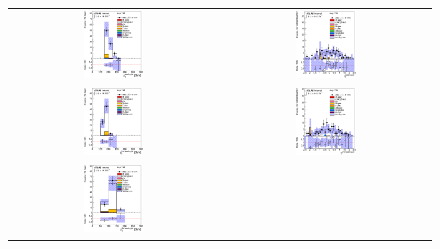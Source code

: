 \clearpage
\begin{figure}[htbp]
\begin{center}
\begin{tabular}{cc}
%
\includegraphics[width=0.30\textwidth]{appendices/figures/sdrs/JetPt1_ELEMUONCR1_1W_NOMINAL.eps} &
\includegraphics[width=0.30\textwidth]{appendices/figures/sdrs/JetEta1_ELEMUONCR1_1W_NOMINAL.eps} \\
\includegraphics[width=0.30\textwidth]{appendices/figures/sdrs/JetPt2_ELEMUONCR1_1W_NOMINAL.eps} &
\includegraphics[width=0.30\textwidth]{appendices/figures/sdrs/JetEta2_ELEMUONCR1_1W_NOMINAL.eps} \\
\includegraphics[width=0.30\textwidth]{appendices/figures/sdrs/JetPt3_ELEMUONCR1_1W_NOMINAL.eps} &

\end{tabular}
\end{center}
\end{figure}
